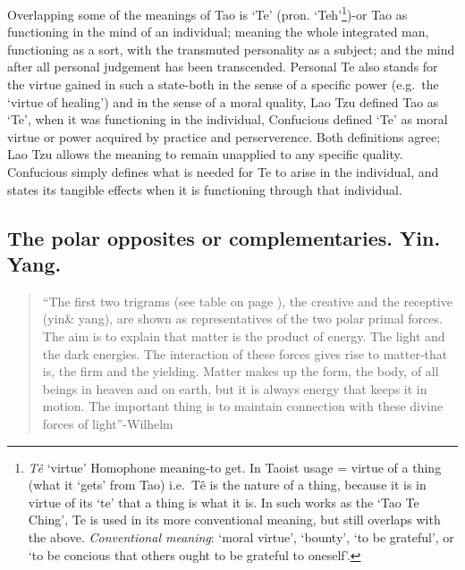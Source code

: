 \documentclass[11pt]{book}
\begin{document}
Overlapping some of the meanings of Tao is `Te' (pron. `Teh'\footnote{\emph{Tê} `virtue' Homophone meaning-to get. In Taoist usage = virtue of a thing (what it `gets' from Tao) i.e.~Tê is the nature of a thing, because it is in virtue of its `te' that a thing is what it is. In such works as the `Tao Te Ching', Te is used in its more conventional meaning, but still overlaps with the above. \emph{Conventional meaning}: `moral virtue', `bounty', `to be grateful', or `to be concious that others ought to be grateful to oneself'.})-or Tao as functioning in the mind of an individual; meaning the whole integrated man, functioning as a sort, with the transmuted personality as a subject; and the mind after all personal judgement has been transcended. Personal Te also stands for the virtue gained in such a state-both in the sense of a specific power (e.g.~the `virtue of healing') and in the sense of a moral quality, Lao Tzu defined Tao as `Te', when it was functioning in the individual, Confucious defined `Te' as moral virtue or power acquired by practice and perserverence. Both definitions agree; Lao Tzu allows the meaning to remain unapplied to any specific quality. Confucious simply defines what is needed for Te to arise in the individual, and states its tangible effects when it is functioning through that individual.


\subsection{The polar opposites or complementaries. Yin. Yang.}

\begin{quote}
  ``The first two trigrams (see table on page \pageref{table:trigrams}), the creative and the receptive (yin\& yang), are shown as representatives of the two polar primal forces. The aim is to explain that matter is the product of energy. The light and the dark energies. The interaction of these forces gives rise to matter-that is, the firm and the yielding. Matter makes up the form, the body, of all beings in heaven and on earth, but it is always energy that keeps it in motion. The important thing is to maintain connection with these divine forces of light''-Wilhelm
\end{quote}
\end{document}
